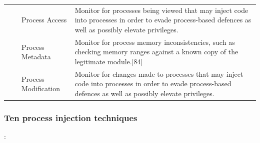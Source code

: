 \documentclass{article}
\begin{document}
\begin{table}[!ht]
\begin{tabular}{ |p{1.2cm}||p{2cm}|p{3cm}|p{8cm}|  }
        & & Process Access & Monitor for processes being viewed that may inject code into processes in order to
                             evade process-based defences as well as possibly elevate privileges. \\
        & & Process Metadata & Monitor for process memory inconsistencies, such as checking memory ranges against a
                               known copy of the legitimate module.[84] \\
        & & Process Modification & Monitor for changes made to processes that may inject code into processes in order
                                   to evade process-based defences as well as possibly elevate privileges. \\
  \hline
\end{tabular}
\label{table: Detection}
\end{table}

\pagebreak

\subsubsection{\textcite{Hosseini:2017} Ten process injection techniques}

\textbf{}: 
\end{document}
